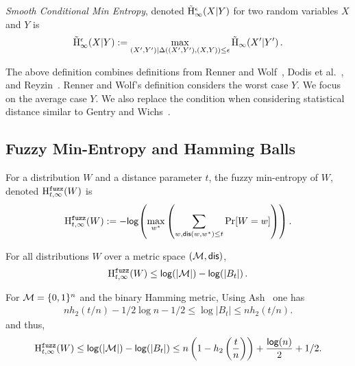\begin{definition}
    \emph{Smooth Conditional Min Entropy}, denoted $\tilde{\mathrm{H}}_\infty^\epsilon(X|Y)$ for two random variables $X$ and $Y$ is \[\tilde{\mathrm{H}}_\infty^\epsilon(X|Y):=\max_{(X',Y') | \Delta((X', Y'), (X, Y))\le \epsilon} \tilde{\mathrm{H}}_{\infty}\!\left(X'|Y'\right).
    \] 
\end{definition}

The above definition combines definitions from Renner and Wolf~\cite{renner2005simple}, Dodis et al.~\cite{dodis2008fuzzy}, and Reyzin~\cite{reyzin2011some}.  Renner and Wolf's definition considers the worst case $Y$.  We focus on the average case $Y$. We also replace the condition when considering statistical distance similar to Gentry and Wichs~\cite{gentry2011separating}.






\subsection{Fuzzy Min-Entropy and Hamming Balls}
\begin{definition}

For a distribution $W$ and a distance parameter $t$, the fuzzy min-entropy of $W$, denoted $\mathrm{H}^{\mathtt{fuzz}}_{t,\infty}(W)$ is 
\[
\mathrm{H}^{\mathtt{fuzz}}_{t,\infty}(W):= -\mathsf{log}\!\left( \max_{w^*} \left(\sum_{w, \mathsf{dis}(w, w^*)\le t} \Pr[W=w] \right)\right).
\]
\end{definition}

\begin{proposition} \label{prop:max fuzz ent}
For all distributions $W$ over a metric space $(\mathcal{M}, \mathsf{dis})$, 
\[\mathrm{H}^{\mathtt{fuzz}}_{t,\infty}(W) \le \mathsf{log}\!\left(|\mathcal{M}|\right) - \mathsf{log}\!\left(|B_t|\right).
\]
\end{proposition}
\noindent
For $\mathcal{M} = \{0, 1\}^n$ and the binary Hamming metric,
Using Ash~\cite[Lemma 4.7.2, Equation 4.7.5, p. 115]{ash2012information} one has
\begin{align} nh_2(t/n)  -1/2\log{n} - 1/2 \le \log{|B_t|} \le  nh_2(t/n)\label{eq:size of balls}.\end{align}
and thus, 
\[
\mathrm{H}^{\mathtt{fuzz}}_{t,\infty}(W) \le \mathsf{log}\!\left(|\mathcal{M}|\right) - \mathsf{log}\!\left(|B_t|\right)\le n\left(1-h_2\left(\frac{t}{n}\right)\right)+ \frac{\mathsf{log}\!\left(n\right)}{2} +1/2.
\]

